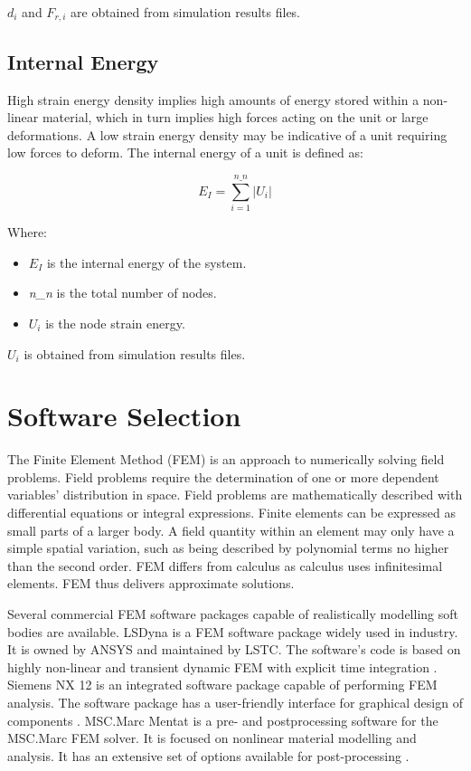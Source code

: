 $d_{i}$ and $F_{r,i}$ are obtained from simulation results files.

\subsection{Internal Energy}

High strain energy density implies high amounts of energy stored within a non-linear material, which in turn implies high forces acting on the unit or large deformations. A low strain energy density may be indicative of a unit requiring low forces to deform. The internal energy of a unit is defined as:

\begin{equation}
	E_{I}=\sum_{i=1}^{n\_n}\left | U_{i} \right |
\end{equation}

Where:

\begin{itemize}
	\item $E_{I}$ is the internal energy of the system.
	\item \textit{n\_n} is the total number of nodes.
	\item $U_{i}$ is the node strain energy.
\end{itemize}

$U_{i}$ is obtained from simulation results files.

\section{Software Selection}

The Finite Element Method (FEM) is an approach to numerically solving field problems. Field problems require the determination of one or more dependent variables' distribution in space. Field problems are mathematically described with differential equations or integral expressions. Finite elements can be expressed as small parts of a larger body. A field quantity within an element may only have a simple spatial variation, such as being described by polynomial terms no higher than the second order. FEM differs from calculus as calculus uses infinitesimal elements. FEM thus delivers approximate solutions. \citep{Cook2002}

Several commercial FEM software packages capable of realistically modelling soft bodies are available. LSDyna is a FEM software package widely used in industry. It is owned by ANSYS and maintained by LSTC. The software's code is based on highly non-linear and transient dynamic FEM with explicit time integration \citep{LSDyna}. Siemens NX 12 is an integrated software package capable of performing FEM analysis. The software package has a user-friendly interface for graphical design of components \citep{NX12}. MSC.Marc Mentat is a pre- and postprocessing software for the MSC.Marc FEM solver. It is focused on nonlinear material modelling and analysis. It has an extensive set of options available for post-processing \citep{MSC}.

